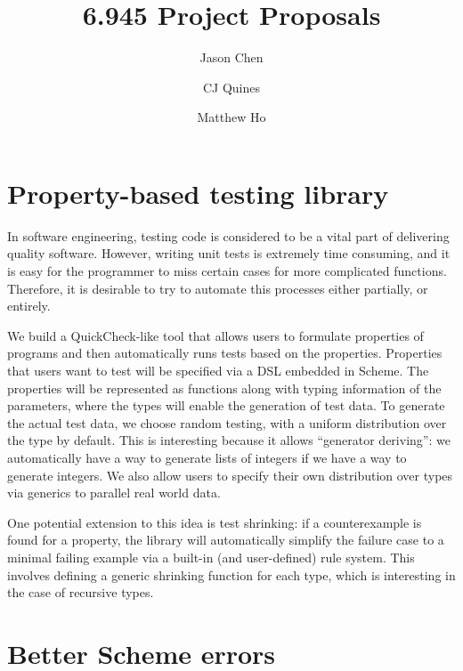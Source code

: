 \documentclass{scrartcl}
\title{6.945 Project Proposals}
\author{Jason Chen \and CJ Quines \and Matthew Ho}
\begin{document}
\maketitle

\section{Property-based testing library}

In software engineering, testing code is considered to
be a vital part of delivering quality software.
However, writing unit tests is extremely time consuming,
and it is easy for the programmer to miss certain cases
for more complicated functions.
Therefore, it is desirable to try to automate this processes
either partially, or entirely.

We build a QuickCheck-like tool that allows users to
formulate properties of programs and then
automatically runs tests based on the properties.
Properties that users want to test will be specified
via a DSL embedded in Scheme.
The properties will be represented as functions
along with typing information of the parameters,
where the types will enable the generation of test data.
To generate the actual test data, we choose random testing,
with a uniform distribution over the type by default.
This is interesting because it allows ``generator deriving'':
we automatically have a way to generate lists of integers
if we have a way to generate integers.
We also allow users to specify their own distribution
over types via generics to parallel real world data. %

One potential extension to this idea is test shrinking:
if a counterexample is found for a property,
the library will automatically simplify
the failure case to a minimal failing example
via a built-in (and user-defined) rule system.
This involves defining a generic shrinking function for each type,
which is interesting in the case of recursive types.



\section{Better Scheme errors}
\end{document}
